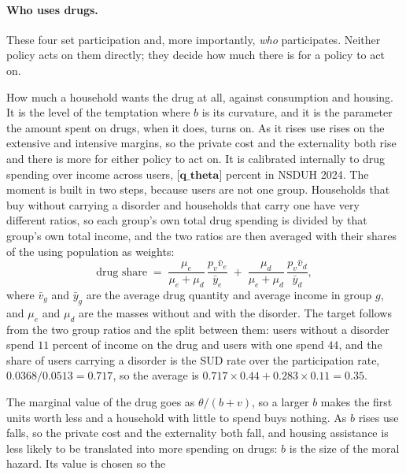 \documentclass[10pt]{article}
\begin{document}
\paragraph{Who uses drugs.} These four set participation and, more importantly,
\emph{who} participates. Neither policy acts on them directly; they decide how much
there is for a policy to act on.
\begin{description}\setlength{\itemsep}{0.25em}\setlength{\parskip}{0em}
\item[$\theta$, the weight on \textcolor{red}{drugs} in utility.]
How much a household wants the drug at all, against consumption and
housing. It is the level of the temptation where $b$ is its curvature, and it is
the parameter the amount spent on drugs, when it does, turns on. As it
rises use rises on the extensive and intensive margins, so the private
cost and the externality both rise and there is more for
either policy to act on. It is calibrated internally to drug spending
over income across users, $\textbf{[q_theta]}$ percent in NSDUH 2024. The moment is
built in two steps, because users are not one group. Households that buy without
carrying a disorder and households that carry one have very different ratios, so
each group's own total drug spending is divided by that group's own total income,
and the two ratios are then averaged with their shares of the using population as
weights:
\begin{equation*}
\text{drug share}\;=\;
\frac{\mu_e}{\mu_e+\mu_d}\,\frac{p_v \bar v_e}{\bar y_e}
\;+\;
\frac{\mu_d}{\mu_e+\mu_d}\,\frac{p_v \bar v_d}{\bar y_d},
\end{equation*}
where $\bar v_g$ and $\bar y_g$ are the average drug quantity and
average income in group $g$, and $\mu_e$ and $\mu_d$ are the masses without and
with the disorder. The target follows from the two group ratios and the split
between them: users without a disorder spend $11$ percent of income on the drug
and users with one spend $44$, and the share of users carrying a
disorder is the SUD rate over the participation rate, $0.0368/0.0513=0.717$, so
the average is $0.717\times0.44+0.283\times0.11=0.35$.
\item[$b$, whether a household uses at all.] The marginal value of the drug goes
as $\theta/(b+v)$, so a larger $b$ makes the first units worth less and a household
with little to spend buys nothing. As $b$ rises use falls, so the
private cost and the externality both fall, and housing assistance is
less likely to be translated into more spending on drugs: $b$ is the size of the
moral hazard. Its value is chosen so the

\end{description}
\end{document}

